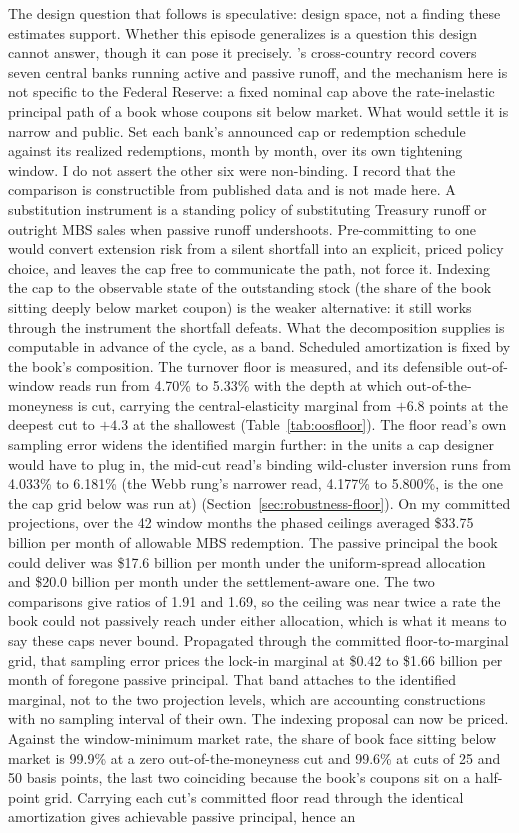 \documentclass[12pt]{article}
\begin{document}
The design question that follows is speculative: design space, not a finding these estimates support. Whether this episode generalizes is a question this design cannot answer, though it can pose it precisely. \citet{du2024}'s cross-country record covers seven central banks running active and passive runoff, and the mechanism here is not specific to the Federal Reserve: a fixed nominal cap above the rate-inelastic principal path of a book whose coupons sit below market. What would settle it is narrow and public. Set each bank's announced cap or redemption schedule against its realized redemptions, month by month, over its own tightening window. I do not assert the other six were non-binding. I record that the comparison is constructible from published data and is not made here. A substitution instrument is a standing policy of substituting Treasury runoff or outright MBS sales when passive runoff undershoots. Pre-committing to one would convert extension risk from a silent shortfall into an explicit, priced policy choice, and leaves the cap free to communicate the path, not force it. Indexing the cap to the observable state of the outstanding stock (the share of the book sitting deeply below market coupon) is the weaker alternative: it still works through the instrument the shortfall defeats. What the decomposition supplies is computable in advance of the cycle, as a band. Scheduled amortization is fixed by the book's composition. The turnover floor is measured, and its defensible out-of-window reads run from 4.70\% to 5.33\% with the depth at which out-of-the-moneyness is cut, carrying the central-elasticity marginal from $+6.8$ points at the deepest cut to $+4.3$ at the shallowest (Table~\ref{tab:oosfloor}). The floor read's own sampling error widens the identified margin further: in the units a cap designer would have to plug in, the mid-cut read's binding wild-cluster inversion runs from 4.033\% to 6.181\% (the Webb rung's narrower read, 4.177\% to 5.800\%, is the one the cap grid below was run at) (Section~\ref{sec:robustness-floor}). On my committed projections, over the 42 window months the phased ceilings averaged \$33.75 billion per month of allowable MBS redemption. The passive principal the book could deliver was \$17.6 billion per month under the uniform-spread allocation and \$20.0 billion per month under the settlement-aware one. The two comparisons give ratios of 1.91 and 1.69, so the ceiling was near twice a rate the book could not passively reach under either allocation, which is what it means to say these caps never bound. Propagated through the committed floor-to-marginal grid, that sampling error prices the lock-in marginal at \$0.42 to \$1.66 billion per month of foregone passive principal. That band attaches to the identified marginal, not to the two projection levels, which are accounting constructions with no sampling interval of their own. The indexing proposal can now be priced. Against the window-minimum market rate, the share of book face sitting below market is 99.9\% at a zero out-of-the-moneyness cut and 99.6\% at cuts of 25 and 50 basis points, the last two coinciding because the book's coupons sit on a half-point grid. Carrying each cut's committed floor read through the identical amortization gives achievable passive principal, hence an 
\end{document}
